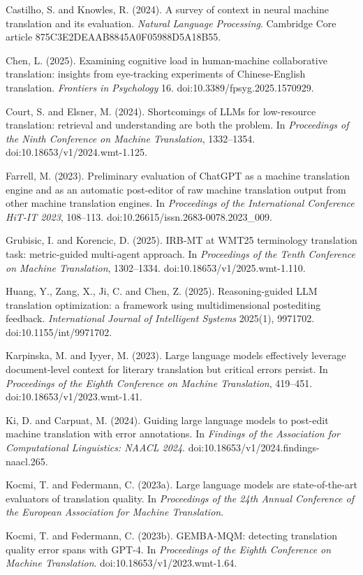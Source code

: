\documentclass[11pt]{article}
\begin{document}
Castilho, S. and Knowles, R. (2024). A survey of context in neural machine translation and its evaluation. \emph{Natural Language Processing}. Cambridge Core article 875C3E2DEAAB8845A0F05988D5A18B55.

Chen, L. (2025). Examining cognitive load in human-machine collaborative translation: insights from eye-tracking experiments of Chinese-English translation. \emph{Frontiers in Psychology} 16. doi:10.3389/fpsyg.2025.1570929.

Court, S. and Elsner, M. (2024). Shortcomings of LLMs for low-resource translation: retrieval and understanding are both the problem. In \emph{Proceedings of the Ninth Conference on Machine Translation}, 1332--1354. doi:10.18653/v1/2024.wmt-1.125.

Farrell, M. (2023). Preliminary evaluation of ChatGPT as a machine translation engine and as an automatic post-editor of raw machine translation output from other machine translation engines. In \emph{Proceedings of the International Conference HiT-IT 2023}, 108--113. doi:10.26615/issn.2683-0078.2023\_009.

Grubisic, I. and Korencic, D. (2025). IRB-MT at WMT25 terminology translation task: metric-guided multi-agent approach. In \emph{Proceedings of the Tenth Conference on Machine Translation}, 1302--1334. doi:10.18653/v1/2025.wmt-1.110.

Huang, Y., Zang, X., Ji, C. and Chen, Z. (2025). Reasoning-guided LLM translation optimization: a framework using multidimensional postediting feedback. \emph{International Journal of Intelligent Systems} 2025(1), 9971702. doi:10.1155/int/9971702.

Karpinska, M. and Iyyer, M. (2023). Large language models effectively leverage document-level context for literary translation but critical errors persist. In \emph{Proceedings of the Eighth Conference on Machine Translation}, 419--451. doi:10.18653/v1/2023.wmt-1.41.

Ki, D. and Carpuat, M. (2024). Guiding large language models to post-edit machine translation with error annotations. In \emph{Findings of the Association for Computational Linguistics: NAACL 2024}. doi:10.18653/v1/2024.findings-naacl.265.

Kocmi, T. and Federmann, C. (2023a). Large language models are state-of-the-art evaluators of translation quality. In \emph{Proceedings of the 24th Annual Conference of the European Association for Machine Translation}.

Kocmi, T. and Federmann, C. (2023b). GEMBA-MQM: detecting translation quality error spans with GPT-4. In \emph{Proceedings of the Eighth Conference on Machine Translation}. doi:10.18653/v1/2023.wmt-1.64.
\end{document}
